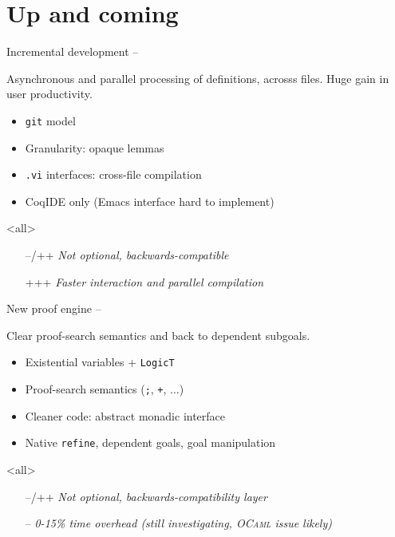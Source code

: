 
\section{Up and coming}


\begin{subsecframe}{Incremental development -- }
  \begin{center}
    Asynchronous and parallel processing of definitions, acrosss files. 
    Huge gain in user productivity.
  \end{center}

  \begin{itemize}
  \item \texttt{git} model
  \item Granularity: opaque lemmas
  \item \texttt{.vi} interfaces: cross-file compilation
  \item CoqIDE only (Emacs interface hard to implement)
  \end{itemize}
  \mode<all>

  \begin{itemize}
  \item[--/++] \emph{Not optional, backwards-compatible}
  \item[+++] \emph{Faster interaction and parallel compilation}
  \end{itemize}
\end{subsecframe}


\begin{subsecframe}{New proof engine -- }
  \begin{center}
    Clear proof-search semantics and back to dependent subgoals.
  \end{center}
  
  \begin{itemize}
  \item Existential variables + \texttt{LogicT}
  \item Proof-search semantics (\texttt{;}, \texttt{+}, $\ldots$)
  \item Cleaner code: abstract monadic interface
  \item Native \texttt{refine}, dependent goals, goal manipulation
  \end{itemize}
  \mode<all>

  \begin{itemize}
  \item[--/++] \emph{Not optional, backwards-compatibility layer}
  \item[--] \emph{0-15\% time overhead (still investigating, \textsc{OCaml} issue likely)}
  \end{itemize}
\end{subsecframe}

